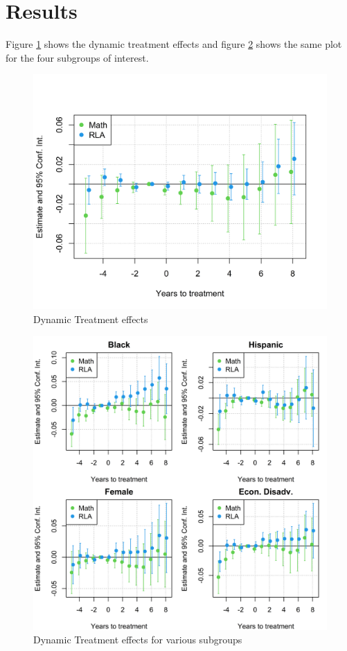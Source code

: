 \section{Results} \label{Results}

Figure \ref{ResultsPlot} shows the dynamic treatment effects and figure \ref{ResultsPlotSub} shows the same plot for the four subgroups of interest. 

\begin{figure}[!h]
	\centering
	\includegraphics[scale=1]{"../Code & Data/ResultsPlot.png"}
	\caption{Dynamic Treatment effects}
	\label{ResultsPlot}
\end{figure}

\begin{figure}[!h]
	\centering
	\includegraphics[scale=1]{"../Code & Data/ResultsPlotSub.png"}
	\caption{Dynamic Treatment effects for various subgroups}
	\label{ResultsPlotSub}
\end{figure}


